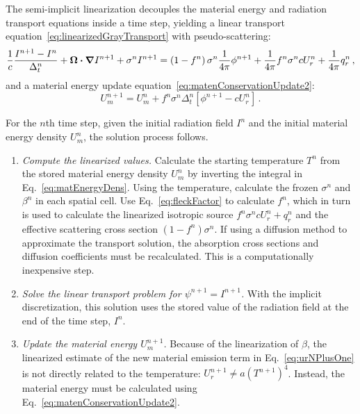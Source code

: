 The semi-implicit linearization decouples the material energy and radiation
transport equations inside a time step, yielding a linear transport
equation~\eqref{eq:linearizedGrayTransport} with pseudo-scattering:
\begin{equation*}
  \frac{1}{c} \frac{I^{n+1} - I^n}{\Delta_t^n}
  + \bm{\Omega} \bm{\cdot} \bm{\nabla} I^{n+1}
 + \sigma^n I^{n+1}
 =  \left(1 - f^n\right) \sigma^n \frac{1}{4\pi} \phi^{n+1}
 + \frac{1}{4\pi} f^n \sigma^n c U_r^n
  + \frac{1}{4\pi} q_r^n \,,
\end{equation*}
and a material energy update equation~\eqref{eq:matenConservationUpdate2}:
\begin{equation*}
  U_m^{n+1} = U_m^n + f^n \sigma^n \Delta_t^n
  \left[ \phi^{n+1} - c U_r^n \right] \,.
\end{equation*}


For the $n$th time step, given the initial radiation field $I^{n}$ and the
initial material energy density $U_m^n$, the solution process follows.
\begin{enumerate}
  \item \emph{Compute the linearized values.}
    Calculate the starting temperature $T^n$
    from the stored material energy density $U_m^n$ by inverting the integral in
    Eq.~\eqref{eq:matEnergyDens}. Using the temperature,
    calculate
    the frozen $\sigma^n$ and $\beta^n$ in each spatial cell. Use
    Eq.~\eqref{eq:fleckFactor} to calculate $f^n$, which in turn is used to
    calculate the linearized isotropic source $f^n \sigma^n c U_r^n + q_r^n$
    and the effective scattering cross section $\left(1 - f^n\right) \sigma^n$.
    If using a diffusion method to approximate the transport solution, the
    absorption cross sections and diffusion coefficients must be recalculated.
    This is a computationally inexpensive step.

  \item \emph{Solve the linear transport problem for $\psi^{n+1}=I^{n+1}$.} With the
    implicit discretization, this solution uses the stored value of the radiation
    field at the end of the time step, $I^n$.
    
  \item \emph{Update the material energy $U_m^{n+1}$.}
    Because of the linearization of
    $\beta$, the linearized estimate of the new material emission term in
    Eq.~\eqref{eq:urNPlusOne} is not directly related to the temperature:
    $U_r^{n+1} \ne a (T^{n+1})^4$. Instead, the material energy must be calculated
    using Eq.~\eqref{eq:matenConservationUpdate2}.
\end{enumerate}


